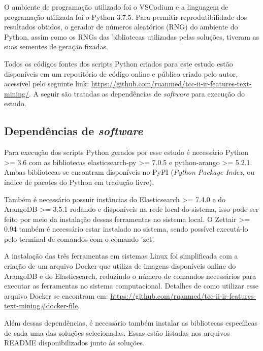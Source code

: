 		O ambiente de programação utilizado foi o VSCodium e a linguagem de programação utilizada foi o Python 3.7.5.
		Para permitir reprodutibilidade dos resultados obtidos, o gerador de números aleatórios (RNG) do ambiente do Python, assim como os RNGs das bibliotecas utilizadas pelas soluções, tiveram as suas sementes de geração fixadas.

		Todos os códigos fontes dos scripts Python criados para este estudo estão disponíveis em um repositório de código online e público criado pelo autor, acessível pelo seguinte link: \url{https://github.com/ruanmed/tcc-ii-ir-features-text-mining/}.
		A seguir são tratadas as dependências de \textit{software} para execução do estudo.

		\subsection{Dependências de \textit{software}} \label{subsec:DependênciasSoftware}
			Para execução dos scripts Python gerados por esse estudo é necessário Python >= 3.6 com as bibliotecas elasticsearch-py >= 7.0.5 e python-arango >= 5.2.1.
			Ambas bibliotecas se encontram disponíveis no PyPI (\textit{Python Package Index}, ou índice de pacotes do Python em tradução livre).

			Também é necessário possuir instâncias do Elasticsearch >= 7.4.0 e do ArangoDB >= 3.5.1 rodando e disponíveis na rede local do sistema, isso pode ser feito por meio da instalação dessas ferramentas no sistema local.
			O Zettair >= 0.94 também é necessário estar instalado no sistema, sendo possível executá-lo pelo terminal de comandos com o comando 'zet'.

			A instalação das três ferramentas em sistemas Linux foi simplificada com a criação de um arquivo Docker que utiliza de imagens disponíveis online do ArangoDB e do Elasticsearch, reduzindo o número de comandos necessários para executar as ferramentas no sistema computacional.
			Detalhes de como utilizar esse arquivo Docker se encontram em: \url{https://github.com/ruanmed/tcc-ii-ir-features-text-mining\#docker-file}.

			Além dessas dependências, é necessário também instalar as bibliotecas específicas de cada uma das soluções selecionadas.
			Essas estão listadas nos arquivos README disponibilizados junto às soluções.

